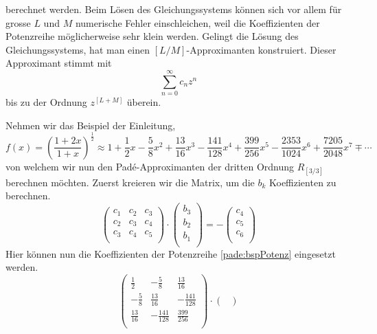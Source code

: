 berechnet werden.
Beim Lösen des Gleichungssystems können sich vor allem für grosse $L$ und $M$ numerische Fehler einschleichen, weil die Koeffizienten der Potenzreihe möglicherweise sehr klein werden. 
Gelingt die Lösung des Gleichungssystems, hat man einen $[L/M]$-Approximanten konstruiert.
Dieser Approximant stimmt mit 
\begin{equation}
\sum_{n=0}^{\infty} c_{n} z^{n}
\end{equation}
bis zu der Ordnung $z^{[L+M]}$ überein.

\begin{beispiel}


Nehmen wir das Beispiel der Einleitung,
\begin{equation}
f(x)
=
\left(\frac{1+2x}{1+x}\right)^{\frac{1}{2}}
\approx
1+\frac{1}{2}x - \frac{5}{8}x^2+\frac{13}{16}x^3 -\frac{141}{128}x^4 +\frac{399}{256}x^5 - \frac{2353}{1024}x^6 + \frac{7205}{2048}x^7 \mp \cdots
\label{pade:bspPotenz}
\end{equation}
von welchem wir nun den Padé-Approximanten der dritten Ordnung $R_{[3/3]}$ berechnen möchten.
Zuerst kreieren wir die Matrix, um die $b_k$ Koeffizienten zu berechnen.
\[
\renewcommand\arraystretch{1.25}
\begin{pmatrix}
c_{1} & c_{2} & c_{3}\\
c_{2} & c_{3} & c_{4}\\
c_{3} & c_{4} & c_{5} \\
\end{pmatrix}
\cdot
\begin{pmatrix}
b_{3}\\
b_{2}\\
b_{1}\\
\end{pmatrix}
=
-
\begin{pmatrix}
c_{4}\\
c_{5}\\
c_{6}\\
\end{pmatrix}
\]
Hier können nun die Koeffizienten der Potenzreihe \ref{pade:bspPotenz} eingesetzt werden.
\[
\renewcommand\arraystretch{1.25}
\begin{pmatrix}
\frac{1}{2} & -\frac{5}{8} & \frac{13}{16}\\
-\frac{5}{8} & \frac{13}{16}& -\frac{141}{128}\\
\frac{13}{16} & -\frac{141}{128} & \frac{399}{256} \\
\end{pmatrix}
\cdot
\begin{pmatrix}

\end{pmatrix}\]
\end{beispiel}

